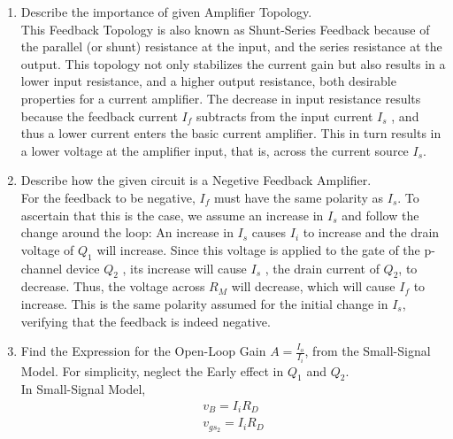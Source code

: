 \begin{enumerate}[label=\thesubsection.\arabic*.,ref=\thesubsection.\theenumi]
\item Describe the importance of given Amplifier Topology.\\
\solution 
This Feedback Topology is also known as Shunt-Series Feedback because of the parallel (or shunt) resistance at the input, and the series resistance at the output. This topology not only stabilizes the current gain but also results in a lower input resistance, and a higher output resistance, both desirable properties for a current amplifier. The decrease in input resistance results because the feedback current $I_{f}$ subtracts from the input current $I_{s}$ , and thus a lower current enters the basic current amplifier. This in turn results in a lower voltage at the amplifier input, that is, across the current source $I_{s}$.
\item Describe how the given circuit is a Negetive Feedback Amplifier.\\
\solution 
For the feedback to be negative, $I_{f}$ must have the same polarity as $I_{s}$. To ascertain that this is the case, we assume an increase in $I_{s}$ and follow the change around the loop: An increase in $I_{s}$ causes $I_{i}$ to increase and the drain voltage of $Q_{1}$ will increase. Since this voltage is applied to the gate of the p-channel device $Q_{2}$ , its increase will cause $I_{s}$ , the drain current of $Q_{2}$, to decrease. Thus, the voltage across $R_{M}$ will decrease, which will cause $I_{f}$ to increase. This is the same polarity assumed for the initial change in
$I_{s}$, verifying that the feedback is indeed negative.
\item Find the Expression for the Open-Loop Gain $A=\frac{I_{o}}{I_{i}}$, from the Small-Signal Model. For simplicity, neglect the Early effect in $Q_{1}$ and $Q_{2}$.\\
\solution
In Small-Signal Model,
\begin{align}
v_{B} = I_{i}R_{D}\\
v_{gs_{2}} = I_{i}R_{D}
\end{align}


\end{enumerate}
